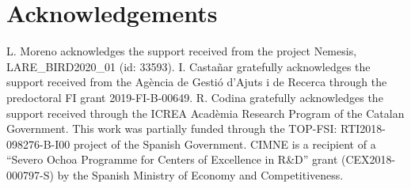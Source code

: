 \documentclass[11pt,english]{article}
\begin{document}
\section*{Acknowledgements}

L. Moreno acknowledges the support received from the project Nemesis, LARE\_BIRD2020\_01 (id: 33593). I. Casta\~nar gratefully acknowledges the support received from the Ag\`encia de Gesti\'o d'Ajuts i de Recerca through the predoctoral FI grant 2019-FI-B-00649. R. Codina gratefully acknowledges the support received through the ICREA Acad\`emia Research Program of the Catalan Government. This work was partially funded through the TOP-FSI: RTI2018-098276-B-I00 project of the Spanish Government. CIMNE is a recipient of a ``Severo Ochoa Programme for Centers of Excellence in R\&D'' grant (CEX2018-000797-S) by the Spanish Ministry of Economy and Competitiveness.
               


\end{document}
